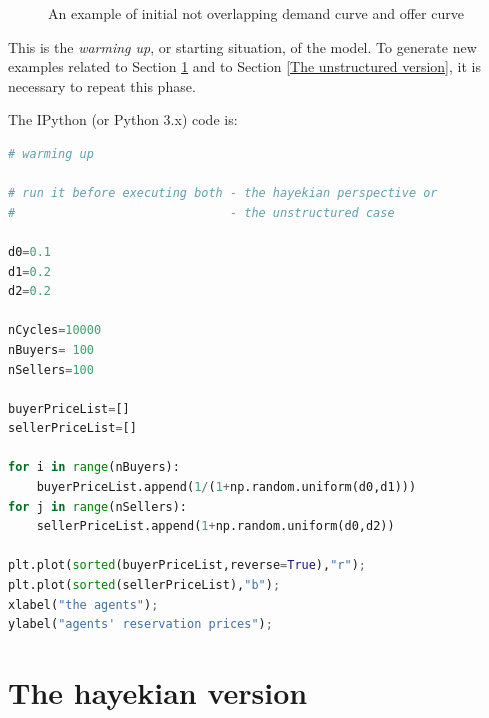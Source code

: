 \documentclass[12pt]{report}
\begin{document}
\begin{figure}[htbp]
\begin{center}
\caption{An example of initial not overlapping demand curve and offer curve}
\label{output_2_0.png}
\end{center}
\end{figure}

This is the \emph{warming up}, or starting situation, of the model. To generate new examples related to Section \ref{The hayekian version} and to Section \ref{The unstructured version}, it is necessary to repeat this phase.

The IPython (or Python 3.x) code is:

\begin{lstlisting}[language=Python, caption=Warming up of the model, basicstyle=\ttfamily\footnotesize]
# warming up

# run it before executing both - the hayekian perspective or
#                              - the unstructured case

d0=0.1
d1=0.2
d2=0.2

nCycles=10000
nBuyers= 100
nSellers=100

buyerPriceList=[]
sellerPriceList=[]

for i in range(nBuyers):
    buyerPriceList.append(1/(1+np.random.uniform(d0,d1)))
for j in range(nSellers):
    sellerPriceList.append(1+np.random.uniform(d0,d2))
    
plt.plot(sorted(buyerPriceList,reverse=True),"r");
plt.plot(sorted(sellerPriceList),"b");
xlabel("the agents");
ylabel("agents' reservation prices");
\end{lstlisting}

\section{The hayekian version}\label{The hayekian version}
 
\end{document}
